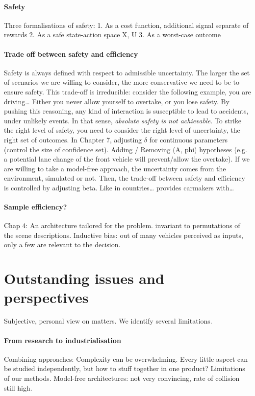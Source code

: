 \paragraph{Safety}
Three formalisations of safety:
1.	As a cost function, additional signal separate of rewards
2.	As a safe state-action space X, U
3.	As a worst-case outcome

\paragraph{Trade off between safety and efficiency}
Safety is always defined with respect to admissible uncertainty. The larger the set of scenarios we are willing to consider, the more conservative we need to be to ensure safety.
This trade-off is irreducible: consider the following example, you are driving…
Either you never allow yourself to overtake, or you lose safety. 
By pushing this reasoning, any kind of interaction is susceptible to lead to accidents, under unlikely events.
In that sense, \emph{absolute safety is not achievable}. To strike the right level of safety, you need to consider the right level of uncertainty, the right set of outcomes.
In Chapter 7, adjusting $\delta$ for continuous parameters (control the size of confidence set).
Adding / Removing (A, phi) hypotheses (e.g. a potential lane change of the front vehicle will prevent/allow the overtake).
If we are willing to take a model-free approach, the uncertainty comes from the environment, simulated or not. Then, the trade-off between safety and efficiency is controlled by adjusting beta. Like in countries… provides carmakers with…

\paragraph{Sample efficiency?}
Chap 4: An architecture tailored for the problem. invariant to permutations of the scene descriptions. Inductive bias: out of many vehicles perceived as inputs, only a few are relevant to the decision.

\section{Outstanding issues and perspectives}
Subjective, personal view on matters.
We identify several limitations.

\paragraph{From research to industrialisation}
Combining approaches: Complexity can be overwhelming. Every little aspect can be studied independently, but how to stuff together in one product?
Limitations of our methods. Model-free architectures: not very convincing, rate of collision still high.

